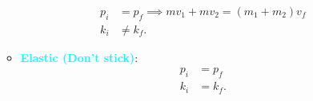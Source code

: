 \documentclass{report}
\begin{document}
\begin{itemize}
\begin{itemize}
                    \begin{align*}
                        p_{i} &= p_{f} \implies mv_{1} + mv_{2} = (m_{1} + m_{2})v_{f}\\
                        k_{i} &\neq k_{f}
                    .\end{align*}
                \item \textbf{\textcolor{cyan}{Elastic (Don't stick)}}:
                    \begin{align*}
                        p_{i} &= p_{f} \\
                        k_{i} &= k_{f}
                    .\end{align*}
            \end{itemize}
    \end{itemize}

    \pagebreak 
\end{document}
